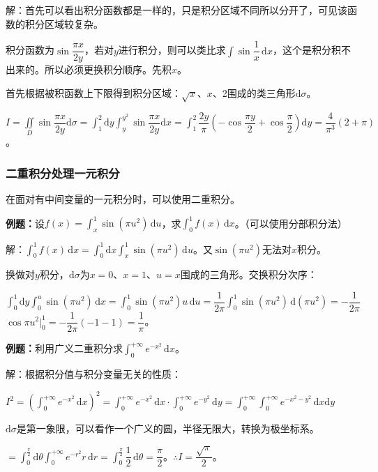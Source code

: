 \documentclass[UTF8, 12pt]{ctexart}
\begin{document}
        解：首先可以看出积分函数都是一样的，只是积分区域不同所以分开了，可见该函数的积分区域较复杂。

        积分函数为$\sin\dfrac{\pi x}{2y}$，若对$y$进行积分，则可以类比求$\displaystyle{\int\sin\dfrac{1}{x}\,\textrm{d}x}$，这个是积分积不出来的。所以必须更换积分顺序。先积$x$。

        首先根据被积函数上下限得到积分区域：$\sqrt{x}$、$x$、2围成的类三角形$\textrm{d}\sigma$。

        $I=\displaystyle{\iint\limits_D\sin\dfrac{\pi x}{2y}\textrm{d}\sigma}=\displaystyle{\int_1^2\textrm{d}y\int_y^{y^2}\sin\dfrac{\pi x}{2y}\textrm{d}x}=\displaystyle{\int_1^2\dfrac{2y}{\pi}\left(-\cos\dfrac{\pi y}{2}+\cos\dfrac{\pi}{2}\right)}\textrm{d}y=\dfrac{4}{\pi^3}(2+\pi)$。

        \subsubsection{二重积分处理一元积分}

        在面对有中间变量的一元积分时，可以使用二重积分。

        \textbf{例题：}设$f(x)=\int_x^1\sin(\pi u^2)\,\textrm{d}u$，求$\int_0^1f(x)\,\textrm{d}x$。（可以使用分部积分法）

        解：$\int_0^1f(x)\,\textrm{d}x=\int_0^1\textrm{d}x\int_x^1\sin(\pi u^2)\,\textrm{d}u$。又$\sin(\pi u^2)$无法对$x$积分。

        换做对$y$积分，$\textrm{d}\sigma$为$x=0$、$x=1$、$u=x$围成的三角形。交换积分次序：

        $\int_0^1\textrm{d}y\int_0^u\sin(\pi u^2)\,\textrm{d}x=\int_0^1\sin(\pi u^2)u\,\textrm{d}u=\dfrac{1}{2\pi}\int_0^1\sin(\pi u^2)\,\textrm{d}(\pi u^2)=-\dfrac{1}{2\pi}$\\$\cos\pi u^2|_0^1=-\dfrac{1}{2\pi}(-1-1)=\dfrac{1}{\pi}$。

        \textbf{例题：}利用广义二重积分求$\int_0^{+\infty}e^{-x^2}\,\textrm{d}x$。

        解：根据积分值与积分变量无关的性质：

        $I^2=(\int_0^{+\infty}e^{-x^2}\,\textrm{d}x)^2=\int_0^{+\infty}e^{-x^2}\,\textrm{d}x\cdot\int_0^{+\infty}e^{-y^2}\,\textrm{d}y=\int_0^{+\infty}\int_0^{+\infty}e^{-x^2-y^2}\,\textrm{d}x\textrm{d}y$

        $\textrm{d}\sigma$是第一象限，可以看作一个广义的圆，半径无限大，转换为极坐标系。

        $=\int_0^\frac{\pi}{2}\textrm{d}\theta\int_0^{+\infty}e^{-r^2}r\,\textrm{d}r=\displaystyle{\int_0^\frac{\pi}{2}\dfrac{1}{2}\,\textrm{d}\theta}=\dfrac{\pi}{2}$。$\therefore I=\dfrac{\sqrt{\pi}}{2}$。
\end{document}

